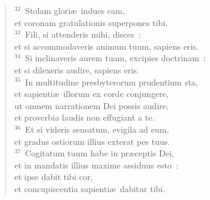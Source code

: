 \begin{verse}
${}^{32}$~Stolam glori\ae\ indues eam,\\ et coronam gratulationis superpones tibi.\\
${}^{33}$~Fili, si attenderis mihi, disces~:\\ et si accommodaveris animum tuum, sapiens eris.\\
${}^{34}$~Si inclinaveris aurem tuam, excipies doctrinam~:\\ et si dilexeris audire, sapiens eris.\\
${}^{35}$~In multitudine presbyterorum prudentium sta,\\ et sapienti\ae\ illorum ex corde conjungere,\\ ut omnem narrationem Dei possis audire,\\ et proverbia laudis non effugiant a te.\\
${}^{36}$~Et si videris sensatum, evigila ad eum,\\ et gradus ostiorum illius exterat pes tuus.\\
${}^{37}$~Cogitatum tuum habe in pr\ae ceptis Dei,\\ et in mandatis illius maxime assiduus esto~:\\ et ipse dabit tibi cor,\\ et concupiscentia sapienti\ae\ dabitur tibi.\end{verse}


